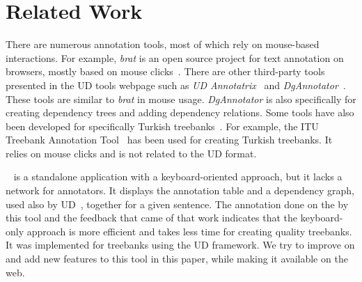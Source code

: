 \section{Related Work}
\label{sec:related}

There are numerous annotation tools, most of which rely on mouse-based interactions.
For example, \textit{brat} is an open source project for text annotation on browsers, mostly based on mouse clicks~\cite{brat,UD}.
There are other third-party tools presented in the UD tools webpage such as \textit{UD Annotatrix}~\cite{tyers-etal:2018} and \textit{DgAnnotator}~\cite{dgannotator}.
These tools are similar to \textit{brat} in mouse usage.
\textit{DgAnnotator} is also specifically for creating dependency trees and adding dependency relations.
Some tools have also been developed for specifically Turkish treebanks~\cite{turk-etal-2019-turkish}.
For example, the ITU Treebank Annotation Tool~\cite{pamay-etal-2015-annotation} has been used for creating Turkish treebanks.
It relies on mouse clicks and is not related to the UD format.

\boatvone~\cite{turk-etal-2019-turkish} is a standalone application with a keyboard-oriented approach, but it lacks a network for annotators.
It displays the annotation table and a dependency graph, used also by UD~\cite{UD}, together for a given sentence.
The annotation done on the \bountreebank{} by this tool and the feedback that came of that work indicates that the keyboard-only approach is more efficient and takes less time for creating quality treebanks.
It was implemented for treebanks using the UD framework.
We try to improve on and add new features to this tool in this paper, while making it available on the web.
